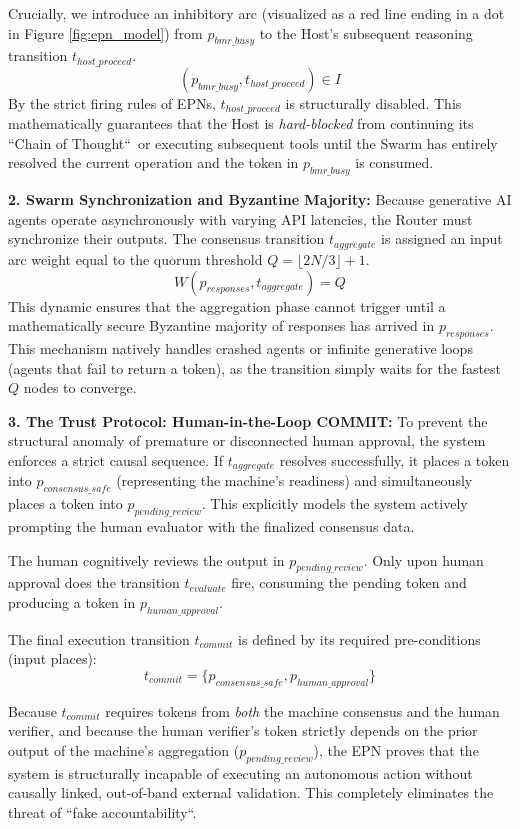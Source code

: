 \documentclass[a4paper,11pt,twocolumn]{article}
\theoremstyle{definition}
\theoremstyle{plain}
\begin{document}
Crucially, we introduce an inhibitory arc (visualized as a red line ending in a dot in Figure \ref{fig:epn_model}) from $p_{bmr\_busy}$ to the Host's subsequent reasoning transition $t_{host\_proceed}$. 
$$ (p_{bmr\_busy}, t_{host\_proceed}) \in I $$
By the strict firing rules of EPNs, $t_{host\_proceed}$ is structurally disabled. This mathematically guarantees that the Host is \textit{hard-blocked} from continuing its “Chain of Thought“\ or executing subsequent tools until the Swarm has entirely resolved the current operation and the token in $p_{bmr\_busy}$ is consumed.

\textbf{2. Swarm Synchronization and Byzantine Majority:}
Because generative AI agents operate asynchronously with varying API latencies, the Router must synchronize their outputs. The consensus transition $t_{aggregate}$ is assigned an input arc weight equal to the quorum threshold $Q = \lfloor 2N/3 \rfloor + 1$. 
$$ W(p_{responses}, t_{aggregate}) = Q $$
This dynamic ensures that the aggregation phase cannot trigger until a mathematically secure Byzantine majority of responses has arrived in $p_{responses}$. This mechanism natively handles crashed agents or infinite generative loops (agents that fail to return a token), as the transition simply waits for the fastest $Q$ nodes to converge.

\textbf{3. The Trust Protocol: Human-in-the-Loop COMMIT:}
To prevent the structural anomaly of premature or disconnected human approval, the system enforces a strict causal sequence. If $t_{aggregate}$ resolves successfully, it places a token into $p_{consensus\_safe}$ (representing the machine's readiness) and simultaneously places a token into $p_{pending\_review}$. This explicitly models the system actively prompting the human evaluator with the finalized consensus data.

The human cognitively reviews the output in $p_{pending\_review}$. Only upon human approval does the transition $t_{evaluate}$ fire, consuming the pending token and producing a token in $p_{human\_approval}$.

The final execution transition $t_{commit}$ is defined by its required pre-conditions (input places):
$$ t_{commit} = \{ p_{consensus\_safe}, p_{human\_approval} \} $$

Because $t_{commit}$ requires tokens from \textit{both} the machine consensus and the human verifier, and because the human verifier's token strictly depends on the prior output of the machine's aggregation ($p_{pending\_review}$), the EPN proves that the system is structurally incapable of executing an autonomous action without causally linked, out-of-band external validation. This completely eliminates the threat of “fake accountability“.
\end{document}
